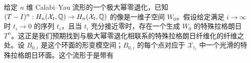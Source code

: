 给定 $n$ 维 Calabi--Yau 流形的一个极大幂零退化，已知 $(T-I)^n:H_n(\mathcal{X}_t,\mathbb{Q})\to H_n(\mathcal{X}_t,\mathbb{Q})$ 的像是一维子空间 $W_0$。假设给定满足 $i\to\infty$ 时 $t_i\to0$ 的序列 $t_i$，且当 $t_i$ 充分接近零时，存在一个生成 $W_0$ 的特殊拉格朗日 $T^n$。这正是我们预期找到与极大幂零退化相联系的特殊拉格朗日纤维化的纤维之处。设 $B_{0,i}$ 是这个环面的形变模空间；$B_{0,i}$ 的每个点对应于 $\mathcal{X}_{t_i}$ 中一个光滑的特殊拉格朗日环面。这个流形于是带有
